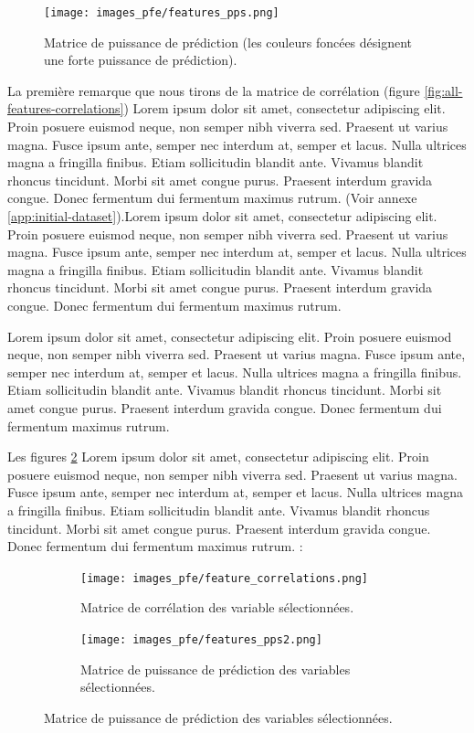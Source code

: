 \begin{figure}[hbt!]
  \centering
  \texttt{[image: images\_pfe/features\_pps.png]}
  \caption{Matrice de puissance de prédiction (les couleurs foncées désignent une forte puissance de prédiction).}
  \label{fig:all-features-pps}
\end{figure}
\FloatBarrier

La première remarque que nous tirons de la matrice de corrélation (figure \ref{fig:all-features-correlations}) Lorem ipsum dolor sit amet, consectetur adipiscing elit. Proin posuere euismod neque, non semper nibh viverra sed. Praesent ut varius magna. Fusce ipsum ante, semper nec interdum at, semper et lacus. Nulla ultrices magna a fringilla finibus. Etiam sollicitudin blandit ante. Vivamus blandit rhoncus tincidunt. Morbi sit amet congue purus. Praesent interdum gravida congue. Donec fermentum dui fermentum maximus rutrum. (Voir annexe \ref{app:initial-dataset}).Lorem ipsum dolor sit amet, consectetur adipiscing elit. Proin posuere euismod neque, non semper nibh viverra sed. Praesent ut varius magna. Fusce ipsum ante, semper nec interdum at, semper et lacus. Nulla ultrices magna a fringilla finibus. Etiam sollicitudin blandit ante. Vivamus blandit rhoncus tincidunt. Morbi sit amet congue purus. Praesent interdum gravida congue. Donec fermentum dui fermentum maximus rutrum.

\medskip

Lorem ipsum dolor sit amet, consectetur adipiscing elit. Proin posuere euismod neque, non semper nibh viverra sed. Praesent ut varius magna. Fusce ipsum ante, semper nec interdum at, semper et lacus. Nulla ultrices magna a fringilla finibus. Etiam sollicitudin blandit ante. Vivamus blandit rhoncus tincidunt. Morbi sit amet congue purus. Praesent interdum gravida congue. Donec fermentum dui fermentum maximus rutrum.

\medskip

Les figures \ref{fig:chosen-features-correlations} Lorem ipsum dolor sit amet, consectetur adipiscing elit. Proin posuere euismod neque, non semper nibh viverra sed. Praesent ut varius magna. Fusce ipsum ante, semper nec interdum at, semper et lacus. Nulla ultrices magna a fringilla finibus. Etiam sollicitudin blandit ante. Vivamus blandit rhoncus tincidunt. Morbi sit amet congue purus. Praesent interdum gravida congue. Donec fermentum dui fermentum maximus rutrum. : \\

\begin{figure}[hbt!]
  \begin{subfigure}[t]{0.4\textwidth}
    \centering
    \texttt{[image: images\_pfe/feature\_correlations.png]}
    \caption{Matrice de corrélation des variable sélectionnées.}
    \label{fig:chosen-features-correlations}
  \end{subfigure}\hfill
  \begin{subfigure}[t]{0.4\textwidth}
    \centering
    \texttt{[image: images\_pfe/features\_pps2.png]}
    \caption{Matrice de puissance de prédiction des variables sélectionnées.}
    \label{fig:chosen-features-pps}
  \end{subfigure}
\end{figure}
\FloatBarrier

